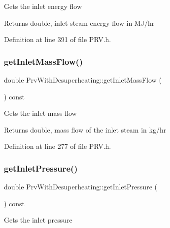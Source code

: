 Gets the inlet energy flow \begin{DoxyReturn}{Returns}
double, inlet steam energy flow in M\+J/hr 
\end{DoxyReturn}


Definition at line 391 of file P\+R\+V.\+h.

\mbox{\label{class_prv_with_desuperheating_a1befd3ab3853429f69d73f738ac29269}} 
\subsubsection{\texorpdfstring{get\+Inlet\+Mass\+Flow()}{getInletMassFlow()}}
{\footnotesize\ttfamily double Prv\+With\+Desuperheating\+::get\+Inlet\+Mass\+Flow (\begin{DoxyParamCaption}{ }\end{DoxyParamCaption}) const\hspace{0.3cm}{\ttfamily [inline]}}

Gets the inlet mass flow

\begin{DoxyReturn}{Returns}
double, mass flow of the inlet steam in kg/hr 
\end{DoxyReturn}


Definition at line 277 of file P\+R\+V.\+h.

\mbox{\label{class_prv_with_desuperheating_adca1724bc5afbe24b4e6c1a057dad111}} 
\subsubsection{\texorpdfstring{get\+Inlet\+Pressure()}{getInletPressure()}}
{\footnotesize\ttfamily double Prv\+With\+Desuperheating\+::get\+Inlet\+Pressure (\begin{DoxyParamCaption}{ }\end{DoxyParamCaption}) const\hspace{0.3cm}{\ttfamily [inline]}}

Gets the inlet pressure

